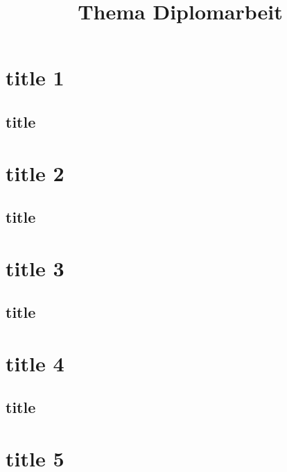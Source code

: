 \documentclass[chapterprefix,%
  headinclude=on,
  ddcfoot,
automark
]{tudscrreprt}
\title{Thema Diplomarbeit}
\makeatletter
\newcommand*\geo{\tud@currentgeometry}
\makeatother
\begin{document}
\makeatother
\maketitle
\clearpage\recalctypearea\clearpage

\part{title 1}
\chapter{title}\geo
\Blindtext\Blindtext

\clearpage\recalctypearea\clearpage
\pagestyle{scrheadings}
\clearpage\recalctypearea\clearpage

\part{title 2}
\chapter{title}\geo
\Blindtext

\clearpage\recalctypearea\clearpage
\pagestyle{tudheadings}
\Blindtext
\clearpage\recalctypearea\clearpage

\part{title 3}
\chapter{title}\geo
\Blindtext\Blindtext

\clearpage\recalctypearea\clearpage
{}
\clearpage\recalctypearea\clearpage

\part{title 4}
\chapter{title}\geo
\Blindtext

\clearpage\recalctypearea\clearpage
\pagestyle{scrheadings}
\clearpage\recalctypearea\clearpage

\part{title 5}
\end{document}
